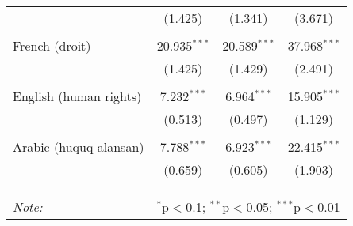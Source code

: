 \begin{table}[!htbp]
\begin{tabular}{@{\extracolsep{5pt}}lccc}
  & (1.425) & (1.341) & (3.671) \\ 
  & & & \\ 
 French (droit) & 20.935$^{***}$ & 20.589$^{***}$ & 37.968$^{***}$ \\ 
  & (1.425) & (1.429) & (2.491) \\ 
  & & & \\ 
 English (human rights) & 7.232$^{***}$ & 6.964$^{***}$ & 15.905$^{***}$ \\ 
  & (0.513) & (0.497) & (1.129) \\ 
  & & & \\ 
 Arabic (huquq alansan) & 7.788$^{***}$ & 6.923$^{***}$ & 22.415$^{***}$ \\ 
  & (0.659) & (0.605) & (1.903) \\ 
  & & & \\ 
\hline \\[-1.8ex] 
\hline 
\hline \\[-1.8ex] 
\textit{Note:}  & \multicolumn{3}{r}{$^{*}$p$<$0.1; $^{**}$p$<$0.05; $^{***}$p$<$0.01} \\ 
\end{tabular} 
\end{table} 

